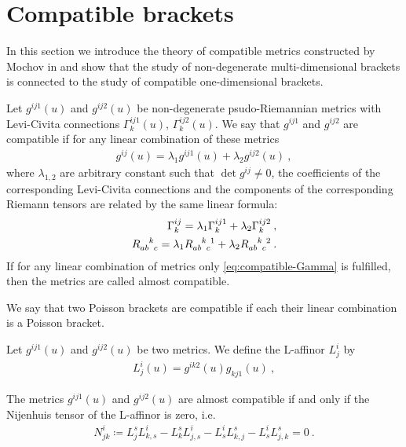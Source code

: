 \section{Compatible brackets}

In this section we introduce the theory of compatible metrics constructed by Mochov in \cite{Mochov} and show that the study of non-degenerate multi-dimensional brackets is connected to the study of compatible one-dimensional brackets. 

\begin{definition}
    Let $g^{ij1}(u)$ and $g^{ij2}(u)$ be non-degenerate psudo-Riemannian metrics with Levi-Civita connections $\Gamma^{ij1}_k(u)$, $\Gamma^{ij2}_k(u)$. We say that $g^{ij1}$ and $g^{ij2}$ are compatible if for any linear combination of these metrics
    \begin{align}
        g^{ij}(u) = \lambda_1 g^{ij1}(u) + \lambda_2 g^{ij2}(u) \:,
    \end{align}
    where $\lambda_{1,2}$ are arbitrary constant such that $\det g^{ij} \neq 0$, the coefficients of the corresponding Levi-Civita connections and the components of the corresponding Riemann tensors are related by the same linear formula:
    \begin{align}
        \Gamma^{ij}_k = \lambda_1 \Gamma^{ij1}_k + \lambda_2 \Gamma^{ij2}_k \:, \label{eq:compatible-Gamma}\\
        R\indices{_a_b^k_c} = \lambda_1 R\indices{_a_b^k_c^1} + \lambda_2 R\indices{_a_b^k_c^2} \label{eq:compatible-R}\:.
    \end{align}
    If for any linear combination of metrics only \eqref{eq:compatible-Gamma} is fulfilled, then the metrics are called almost compatible.
\end{definition}


\begin{definition}
    We say that two Poisson brackets are compatible if each their linear combination is a Poisson bracket.
\end{definition}

\begin{definition}[L-affinor]
    Let $g^{ij1}(u)$ and $g^{ij2}(u)$ be two metrics.
    We define the L-affinor $L^i_j$ by
    \begin{align}
        L^i_j(u) = g^{ik2}(u) g_{kj1}(u) \:,
    \end{align}
\end{definition}

\begin{theorem}
    The metrics $g^{ij1}(u)$ and $g^{ij2}(u)$ are almost compatible if and only if the Nijenhuis tensor of the L-affinor is zero, i.e.
    \begin{align}
        N^i_{jk} \coloneqq L^s_j L^{i}_{k,s} - L^s_k L^{i}_{j,s} - L^i_s L^s_{k,j} - L^i_s L^s_{j,k} = 0 \:.
    \end{align}
\end{theorem}

